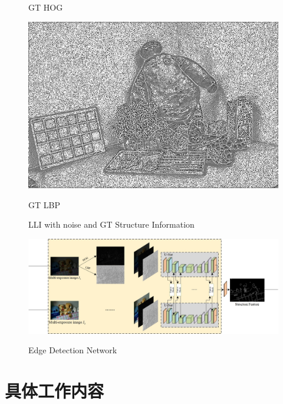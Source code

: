 \documentclass[CJK,aspectratio=169]{beamer}  %
\begin{document}
\begin{frame}
\begin{figure}
\begin{minipage}{.32\textwidth}
				\captionsetup{font=scriptsize}
				\label{fig: GT_hog1}	
				\caption*{GT HOG}
			\end{minipage}
			\begin{minipage}{.32\textwidth}
				\centering
				\includegraphics[width=.8\linewidth]{picture/LLIE/My Architecture/Edge Detection/normal00269_lbp}
				\captionsetup{font=scriptsize}
				\label{fig: GT_lbp1}	
				\caption*{GT LBP}
			\end{minipage}
			\captionsetup{font=scriptsize}
			\caption{
				\label{fig: LLI Structure Information1}
				LLI with noise and GT Structure Information
			}
		\end{figure}
	\end{frame}
	
		\begin{frame}
		\begin{figure}
			\centering
			\begin{minipage}{\textwidth}
				\centering
				\includegraphics[width=\linewidth]{picture/LLIE/My Architecture/Edge Detection Network}
				\captionsetup{font=scriptsize}
				\label{fig: Edge Detection Network}	
				\caption{Edge Detection Network}
			\end{minipage}
		\end{figure}
	\end{frame}
	
	\section{具体工作内容}
	
\end{document}
